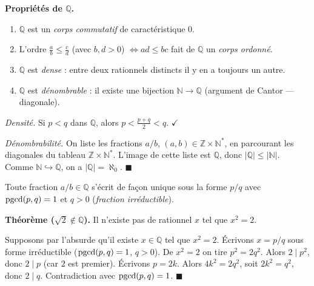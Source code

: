 \begin{tcolorbox}[thmbox]
  \textbf{Propriétés de $\mathbb{Q}$.}\enspace%
  \begin{enumerate}
    \item $\mathbb{Q}$ est un \emph{corps commutatif} de caractéristique $0$.
    \item L'ordre $\tfrac{a}{b} \leq \tfrac{c}{d}$ (avec $b,d > 0$)
          $\Leftrightarrow ad \leq bc$ fait de $\mathbb{Q}$ un \emph{corps ordonné}.
    \item $\mathbb{Q}$ est \emph{dense} : entre deux rationnels distincts
          il y en a toujours un autre.
    \item $\mathbb{Q}$ est \emph{dénombrable} : il existe une bijection
          $\mathbb{N} \to \mathbb{Q}$ (argument de Cantor — diagonale).
  \end{enumerate}
\end{tcolorbox}

\begin{mdframed}[style=proofbar]
  \textit{Densité.} Si $p < q$ dans $\mathbb{Q}$, alors $p < \tfrac{p+q}{2} < q$. $\checkmark$

  \textit{Dénombrabilité.} On liste les fractions $a/b$, $(a,b) \in \mathbb{Z} \times \mathbb{N}^*$,
  en parcourant les diagonales du tableau $\mathbb{Z} \times \mathbb{N}^*$.
  L'image de cette liste est $\mathbb{Q}$, donc $|\mathbb{Q}| \leq |\mathbb{N}|$.
  Comme $\mathbb{N} \hookrightarrow \mathbb{Q}$, on a $|\mathbb{Q}| = \aleph_0$.
  \hfill$\blacksquare$
\end{mdframed}

Toute fraction $a/b \in \mathbb{Q}$ s'écrit de façon unique sous la forme
$p/q$ avec $\operatorname{pgcd}(p,q) = 1$ et $q > 0$ (\emph{fraction irréductible}).

\decsep{}


\begin{tcolorbox}[thmbox]
  \textbf{Théorème ($\sqrt{2} \notin \mathbb{Q}$).}\enspace%
  Il n'existe pas de rationnel $x$ tel que $x^2 = 2$.
\end{tcolorbox}

\begin{mdframed}[style=proofbar]
  Supposons par l'absurde qu'il existe $x \in \mathbb{Q}$ tel que $x^2 = 2$.
  Écrivons $x = p/q$ sous forme irréductible ($\operatorname{pgcd}(p,q) = 1$, $q > 0$).
  De $x^2 = 2$ on tire $p^2 = 2q^2$.
  Alors $2 \mid p^2$, donc $2 \mid p$ (car $2$ est premier). Écrivons $p = 2k$.
  Alors $4k^2 = 2q^2$, soit $2k^2 = q^2$, donc $2 \mid q$. Contradiction avec
  $\operatorname{pgcd}(p,q) = 1$. \hfill$\blacksquare$
\end{mdframed}

